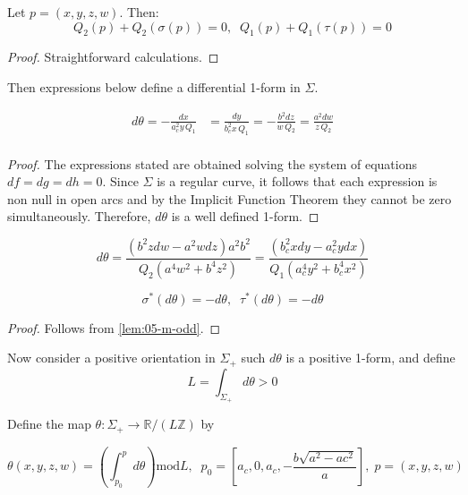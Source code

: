 \begin{lemma} Let $p=(x,y,z,w)$.
Then:
\[
       Q_2(p)+   Q_2(\sigma(p))=0,\;\;     Q_1(p)+   Q_1(\tau(p))=0
\]
\label{lem:05-m-odd}
\end{lemma}

\begin{proof} Straightforward calculations.
\end{proof}

\begin{proposition}
Then expressions below define a differential 1-form in $\Sigma.$

\begin{align*}
  d\theta=  -\frac{dx}{ a_c^2 y\,    Q_1}& =  \frac{dy}{b_c^2 x\,    Q_1}= -\frac{b^2dz}{w\,    Q_2}=\frac{a^2 dw}{z \,   Q_2}\\
\end{align*}
\label{prop:08-dtheta}
\end{proposition}

\begin{proof}
The expressions stated are obtained solving the system of equations $df=dg=dh=0$. Since $\Sigma$ is a regular curve, it follows that each expression is non null in open arcs and by the Implicit Function Theorem   they cannot be zero simultaneously. Therefore, $d\theta$ is a well defined 1-form.
\end{proof}
\begin{remark}
\[ d\theta=\frac{(  b^2   z dw  - a^2  w dz     )   a^2   b^2}{    Q_2   (a^4   w^2 + b^4   z^2)}=\frac{(b_c^2  x dy -a_c^2  y dx         )}{   Q_1   (a_c^4   y^2 + b_c^4   x^2)}
\]
\end{remark}
\begin{proposition}
\[ \sigma^{*}(d\theta)=-d\theta,\;\; \tau^{*}(d\theta)=-d\theta \]
\label{prop:05-invariant-measure}
\end{proposition}

\begin{proof} Follows from \cref{lem:05-m-odd}.
\end{proof}

Now consider a positive  orientation in $\Sigma_+$ such $d\theta$ is a positive 1-form, and define
\[ L=\int_{\Sigma_+ } d\theta >0\]

Define the map
$\theta:\Sigma_+\to \mathbb{R}/(L \mathbb{Z})$ by

\[\theta(x,y,z,w)=\left(\int_{p_0}^p d\theta\right) \text{mod} L ,\;\; p_0=\left[a_c,0,a_c,-\frac{b\sqrt{a^2 - ac^2}}{a}\right],\; p=(x,y,z,w)\]

